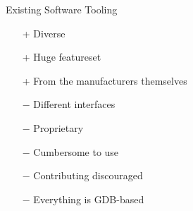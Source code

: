\documentclass[aspectratio=1610,14pt,t]{beamer}
\begin{document}
\begin{frame}[c]{Existing Software Tooling}
  \begin{itemize}
    \item[+] Diverse
    \item[+] Huge featureset
    \item[+] From the manufacturers themselves
    \item[−] Different interfaces
    \item[−] Proprietary
    \item[−] Cumbersome to use
    \item[−] Contributing discouraged
    \item[−] Everything is GDB-based
  \end{itemize}
\end{frame}
\end{document}
